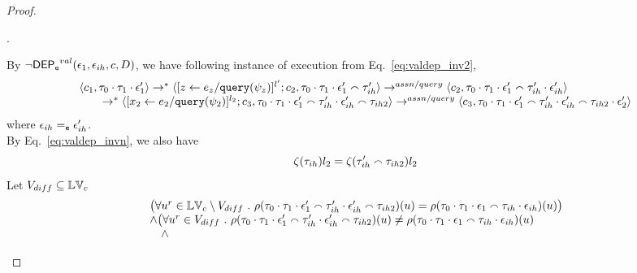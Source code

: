 \begin{proof}
\begin{case}[$\trace_2 = \trace_{ih} \cdot \event_{ih}$]
\begin{subcase}
%
\begin{subsubcase}.
%
\begin{subsubsubcase}
By $\neg \mathsf{DEP_{\mathtt{e}}}^{val}(\mathtt{\epsilon}_1, \mathtt{\epsilon}_{ih}, c, D)$, we have following instance of execution from Eq.~\ref{eq:valdep_inv2}, 
%
\begin{equation}
\label{eq:m1asn_inv2}
  \begin{array}{l}   
  \langle c_1, \mathtt{\tau}_0 \cdot \mathtt{\tau}_1 \cdot \mathtt{\epsilon}_1' \rangle 
  \rightarrow^{*} 
  \langle [\mathrel{ z \leftarrow e_z / {\tt query}(\psi_z) }]^{l'};{c}_2, 
  \mathtt{\tau}_0 \cdot \mathtt{\tau}_1 \cdot \mathtt{\epsilon}_1' \smallfrown \mathtt{\tau}_{ih}' \rangle 
  \rightarrow^{assn/query} 
  \langle {c}_2,  \mathtt{\tau}_0 \cdot \mathtt{\tau}_1 \cdot \mathtt{\epsilon}_1'  \smallfrown \mathtt{\tau}_{ih}' \cdot \mathtt{\epsilon}_{ih}' \rangle  \\
  \qquad \rightarrow^{*} 
  \langle [\mathrel{ {x}_2 \leftarrow e_2 / {\tt query}(\psi_2) }]^{l_2};{c}_3, 
  \mathtt{\tau}_0 \cdot \mathtt{\tau}_1 \cdot \mathtt{\epsilon}_1'  \smallfrown \mathtt{\tau}_{ih}' \cdot \mathtt{\epsilon}_{ih}' \smallfrown \mathtt{\tau}_{ih2} \rangle 
  \rightarrow^{assn/query} 
  \langle {c}_3,  \mathtt{\tau}_0 \cdot \mathtt{\tau}_1 \cdot \mathtt{\epsilon}_1'  \smallfrown \mathtt{\tau}_{ih}' \cdot \mathtt{\epsilon}_{ih}' \smallfrown \mathtt{\tau}_{ih2} \cdot \mathtt{\epsilon}_2' \rangle 
\end{array}
 \end{equation}
 where $\mathtt{\epsilon}_{ih} =_{\mathtt{e}} \mathtt{\epsilon}_{ih}'$.
 \\
 By Eq.~\ref{eq:valdep_invn}, we also have 
 \[
 \mathtt{\zeta}(\mathtt{\tau}_{ih}) l_2 = \mathtt{\zeta}(\mathtt{\tau}_{ih}' \smallfrown \mathtt{\tau}_{ih2}) l_2
 \]
%
Let $V_{diff} \subseteq \mathbb{LV}_c$ 
\[
\begin{array}{l}
  \big(\forall u^r \in \mathbb{LV}_c \setminus V_{diff} ~.~
    \rho(\mathtt{\tau}_0 \cdot \mathtt{\tau}_1 \cdot \mathtt{\epsilon}_1' \smallfrown \mathtt{\tau}_{ih}' \cdot \mathtt{\epsilon}_{ih}' \smallfrown \mathtt{\tau}_{ih2}) (u) =  
    \rho(\mathtt{\tau}_0 \cdot \mathtt{\tau}_1 \cdot \mathtt{\epsilon}_1 \smallfrown \mathtt{\tau}_{ih} \cdot \mathtt{\epsilon}_{ih}) (u)
    \big)
  \\ \land
  \big(\forall u^r \in V_{diff} ~.~ \rho(\mathtt{\tau}_0 \cdot \mathtt{\tau}_1 \cdot \mathtt{\epsilon}_1' \smallfrown \mathtt{\tau}_{ih}' \cdot \mathtt{\epsilon}_{ih}' \smallfrown \mathtt{\tau}_{ih2}) (u) \neq 
    \rho(\mathtt{\tau}_0 \cdot \mathtt{\tau}_1 \cdot \mathtt{\epsilon}_1 \smallfrown \mathtt{\tau}_{ih} \cdot \mathtt{\epsilon}_{ih}) (u) 
    \\ \quad \land

\end{array}\]
\end{subsubsubcase}
\end{subsubcase}
\end{subcase}
\end{case}
\end{proof}
